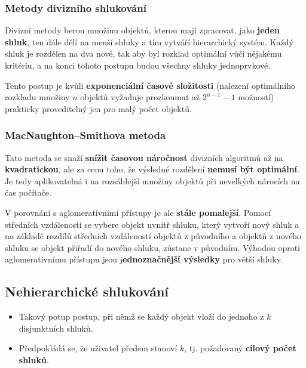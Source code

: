 \subsubsection{Metody divizního shlukování}
Divizní metody berou množinu objektů, kterou mají zpracovat, jako \textbf{jeden shluk}, ten dále dělí na menší shluky a tím vytváří hierarchický systém. Každý shluk je rozdělen na dva nové, tak aby byl rozklad optimální vůči nějakému kritériu, a na konci tohoto postupu budou všechny shluky jednoprvkové. 

Tento postup je kvůli \textbf{exponenciální časové složitosti} (nalezení optimálního rozkladu množiny $n$ objektů vyžaduje prozkoumat až $2^{n-1}-1$ možností) prakticky proveditelný jen pro malý počet objektů.

\subsubsection*{MacNaughton–Smithova metoda}
Tato metoda se snaží \textbf{snížit časovou náročnost} divizních algoritmů až na \textbf{kvadratickou}, ale za cenu toho, že výsledné rozdělení \textbf{nemusí být optimální}. Je tedy aplikovatelná i na rozsáhlejší množiny objektů při nevelkých nárocích na čas počítače.

V porovnání s aglomerativními přístupy je ale \textbf{stále pomalejší}. Pomocí středních vzdáleností se vybere objekt uvnitř shluku, který vytvoří nový shluk a na základě rozdílů středních vzdáleností objektů z původního a objektů z nového shluku se objekt přiřadí do nového shluku, zůstane v původním. Výhodou oproti aglomerativnímu přístupu jsou j\textbf{ednoznačnější výsledky} pro větší shluky.

\subsection{Nehierarchické shlukování}
\begin{itemize}
\item Takový potup postup, při němž se každý objekt vloží do jednoho z $ k $ disjunktních shluků.
\item Předpokládá se, že uživatel předem stanoví $ k $, tj. požadovaný \textbf{cílový počet shluků}.
\end{itemize}

